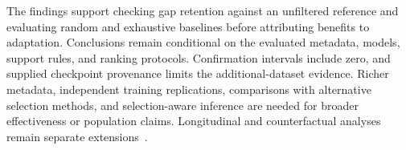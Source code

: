 The findings support checking gap retention against an unfiltered reference and evaluating random and exhaustive baselines before attributing benefits to adaptation. Conclusions remain conditional on the evaluated metadata, models, support rules, and ranking protocols. Confirmation intervals include zero, and supplied checkpoint provenance limits the additional-dataset evidence. Richer metadata, independent training replications, comparisons with alternative selection methods, and selection-aware inference are needed for broader effectiveness or population claims. Longitudinal and counterfactual analyses remain separate extensions~\cite{mansoury2020feedback,zoralioglu2024dynamic,li2021towards,medda2024gnnuers}.

